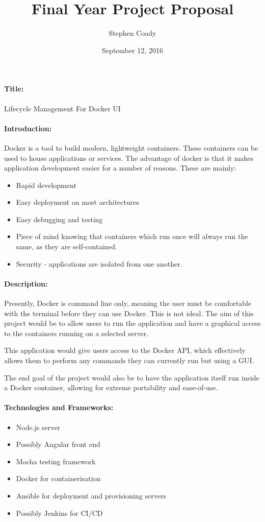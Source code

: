 \documentclass{article}
\author{Stephen Coady}
\title{Final Year Project Proposal}
\date{September 12, 2016}
\begin{document}


\newpage

\paragraph{Title:}
\label{par:Title}
Lifecycle Management For Docker UI

\paragraph{Introduction:}
\label{par:Introduction}
Docker is a tool to build modern, lightweight containers. These containers can be used to house applications or services. The advantage of docker is that it makes application development easier for a number of reasons. These are mainly:

\begin{itemize}
  \item Rapid development
  \item Easy deployment on most architectures
  \item Easy debugging and testing
  \item Piece of mind knowing that containers which run once will always run the same, as they are self-contained.
  \item Security - applications are isolated from one another.
\end{itemize}

\paragraph{Description:}
\label{par:Description}
Presently, Docker is command line only, meaning the user must be comfortable with the terminal before they can use Docker. This is not ideal. The aim of this project would be to allow users to run the application and have a graphical access to the containers running on a selected server.

This application would give users access to the Docker API, which effectively allows them to perform any commands they can currently run but using a GUI.

The end goal of the project would also be to have the application itself run inside a Docker container, allowing for extreme portability and ease-of-use.

\paragraph{Technologies and Frameworks:}
\label{par:Technologies and Frameworks}
\begin{itemize}
	\item Node.js server
	\item Possibly Angular front end
	\item Mocha testing framework
  \item Docker for containerisation
  \item Ansible for deployment and provisioning servers
  \item Possibly Jenkins for CI/CD
\end{itemize}
\end{document}
